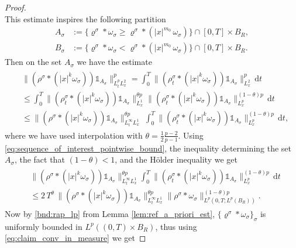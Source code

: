 \documentclass[reqno, 11pt]{amsart}
\numberwithin{equation}{section}
\theoremstyle{definition}
\begin{document}
\begin{proof}
\begin{equation}
    \end{equation}
    This estimate inspires the following partition
    \begin{align*}
        A_\sigma&:=\{\varrho^\sigma\ast\omega_\sigma \geq \varrho^\sigma \ast (|x|^{m_0}\,\omega_\sigma) \}\cap [0,T]\times B_R,\\
        B_\sigma&:=\{\varrho^\sigma\ast\omega_\sigma < \varrho^\sigma \ast (|x|^{m_0}\,\omega_\sigma) \}\cap [0,T]\times B_R.
    \end{align*}
    Then on the set $A_\sigma$ we have the estimate
    \begin{align}
        \label{eq:set_A_1}
        \begin{split}
            &\|(\rho^\sigma\ast(|x|^k\omega_\sigma))\mathds{1}_{A_\sigma}\|_{L_t^p L_x^2}^p
            = \int_0^T
            \|(\rho_t^\sigma\ast(|x|^k\omega_\sigma))\mathds{1}_{A_\sigma}\|_{L_x^2}^p\,\mathrm{d} t\\
            &\leq \int_0^T
            \|(\rho_t^\sigma\ast(|x|^k\omega_\sigma))\mathds{1}_{A_\sigma}\|_{L_x^1}^{\theta p}\|(\rho_t^\sigma\ast(|x|^k\omega_\sigma))\mathds{1}_{A_\sigma}\|_{L_x^p}^{(1-\theta) p}\,\mathrm{d} t\\
            &\leq \|(\rho^\sigma\ast(|x|^k\omega_\sigma))\mathds{1}_{A_\sigma}\|_{L_t^\infty L_x^1}^{\theta p}\;\int_0^T
            \|(\rho_t^\sigma\ast(|x|^k\omega_\sigma))\mathds{1}_{A_\sigma}\|_{L_x^p}^{(1-\theta) p}\,\mathrm{d} t,
        \end{split}
    \end{align}
    where we have used interpolation with $\theta=\frac{1}{2}\frac{p-2}{p-1}$. Using \eqref{eq:sequence_of_interest_pointwise_bound}, the inequality determining the set $A_\sigma$, the fact that $(1-\theta)< 1$, and the H\"older inequality we get
    \begin{align}
        \label{eq:set_A_2}
        \begin{split}
            &\|(\rho^\sigma\ast(|x|^k\omega_\sigma))\mathds{1}_{A_\sigma}\|_{L_t^\infty L_x^1}^{\theta p}\int_0^T
            \|(\rho_t^\sigma\ast(|x|^k\omega_\sigma))\mathds{1}_{A_\sigma}\|_{L_x^p}^{(1-\theta) p}\,\mathrm{d} t\\
            &\leq 2\,T^{\theta}\,\|(\rho^\sigma\ast(|x|^k\omega_\sigma))\mathds{1}_{A_\sigma}\|_{L_t^\infty L_x^1}^{\theta p}
            \|\rho^\sigma\ast\omega_\sigma\|_{L^p(0,T;L^p(B_R))}^{(1-\theta)p}.
        \end{split}
    \end{align}
    Now by \ref{bnd:rap_lp} from Lemma \ref{lem:ref_a_priori_est}, $\{\varrho^\sigma\ast\omega_\sigma\}_\sigma$ is uniformly bounded in $L^p((0,T)\times B_R)$, thus using \eqref{eq:claim_conv_in_measure} we get

\end{proof}
\end{document}
